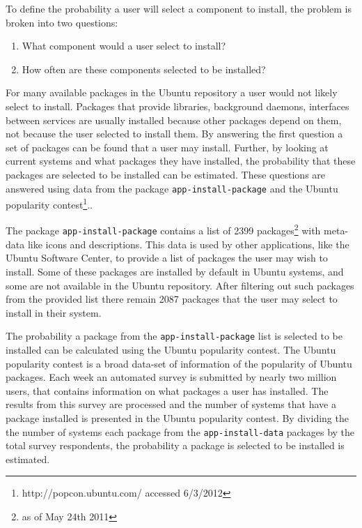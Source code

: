 To define the probability a user will select a component to install, the problem is broken into two questions:
\begin{enumerate}
  \item What component would a user select to install?
  \item How often are these components selected to be installed?
\end{enumerate}
For many available packages in the Ubuntu repository a user would not likely select to install.
Packages that provide libraries, background daemons, interfaces between services are usually installed because other packages depend on them, not because the user selected to install them.
By answering the first question a set of packages can be found that a user may install.
Further, by looking at current systems and what packages they have installed, the probability that these packages are selected to be installed can be estimated.
These questions are answered using data from the package \texttt{app-install-package} and the Ubuntu popularity contest\footnote{http://popcon.ubuntu.com/ accessed 6/3/2012}..

The package \texttt{app-install-package} contains a list of 2399 packages\footnote{as of May 24th 2011} with meta-data like icons and descriptions.
This data is used by other applications, like the Ubuntu Software Center, to provide a list of packages the user may wish to install.
Some of these packages are installed by default in Ubuntu systems, and some are not available in the Ubuntu repository.
After filtering out such packages from the provided list there remain 2087 packages that the user may select to install in their system. 

The probability a package from the \texttt{app-install-package} list is selected to be installed can be calculated using the Ubuntu popularity contest.
The Ubuntu popularity contest is a broad data-set of information of the popularity of Ubuntu packages.
Each week an automated survey is submitted by nearly two million users, that contains information on what packages a user has installed.
The results from this survey are processed and the number of systems that have a package installed is presented in the Ubuntu popularity contest.
By dividing the the number of systems each package from the \texttt{app-install-data} packages  by the total survey respondents, 
the probability a package is selected to be installed is estimated.

